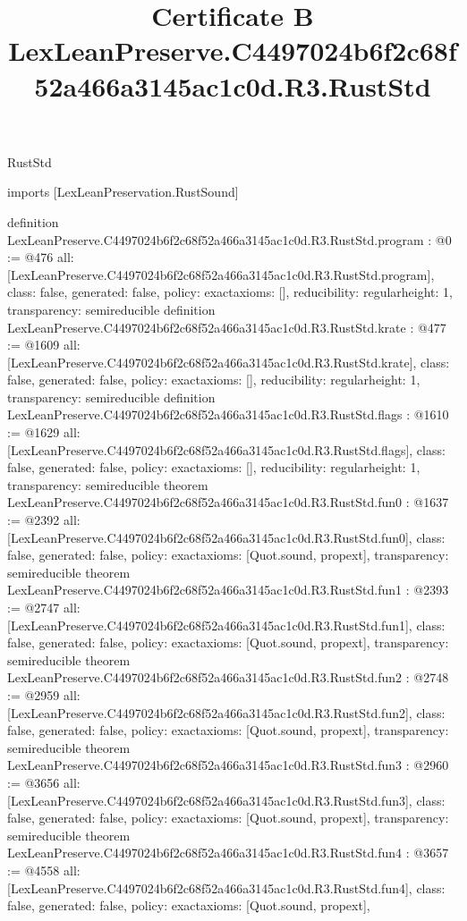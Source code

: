 \begin{lexlean}{RustStd}
\title{Certificate B LexLeanPreserve.C4497024b6f2c68f52a466a3145ac1c0d.R3.RustStd}
\begin{coremodule}
imports [LexLeanPreservation.RustSound]

definition LexLeanPreserve.C4497024b6f2c68f52a466a3145ac1c0d.R3.RustStd.program : @0 := @476 {
  all: [LexLeanPreserve.C4497024b6f2c68f52a466a3145ac1c0d.R3.RustStd.program],
  class: false,
  generated: false,
  policy: exact{axioms: []},
  reducibility: regular{height: 1},
  transparency: semireducible
}
definition LexLeanPreserve.C4497024b6f2c68f52a466a3145ac1c0d.R3.RustStd.krate : @477 := @1609 {
  all: [LexLeanPreserve.C4497024b6f2c68f52a466a3145ac1c0d.R3.RustStd.krate],
  class: false,
  generated: false,
  policy: exact{axioms: []},
  reducibility: regular{height: 1},
  transparency: semireducible
}
definition LexLeanPreserve.C4497024b6f2c68f52a466a3145ac1c0d.R3.RustStd.flags : @1610 := @1629 {
  all: [LexLeanPreserve.C4497024b6f2c68f52a466a3145ac1c0d.R3.RustStd.flags],
  class: false,
  generated: false,
  policy: exact{axioms: []},
  reducibility: regular{height: 1},
  transparency: semireducible
}
theorem LexLeanPreserve.C4497024b6f2c68f52a466a3145ac1c0d.R3.RustStd.fun0 : @1637 := @2392 {
  all: [LexLeanPreserve.C4497024b6f2c68f52a466a3145ac1c0d.R3.RustStd.fun0],
  class: false,
  generated: false,
  policy: exact{axioms: [Quot.sound, propext]},
  transparency: semireducible
}
theorem LexLeanPreserve.C4497024b6f2c68f52a466a3145ac1c0d.R3.RustStd.fun1 : @2393 := @2747 {
  all: [LexLeanPreserve.C4497024b6f2c68f52a466a3145ac1c0d.R3.RustStd.fun1],
  class: false,
  generated: false,
  policy: exact{axioms: [Quot.sound, propext]},
  transparency: semireducible
}
theorem LexLeanPreserve.C4497024b6f2c68f52a466a3145ac1c0d.R3.RustStd.fun2 : @2748 := @2959 {
  all: [LexLeanPreserve.C4497024b6f2c68f52a466a3145ac1c0d.R3.RustStd.fun2],
  class: false,
  generated: false,
  policy: exact{axioms: [Quot.sound, propext]},
  transparency: semireducible
}
theorem LexLeanPreserve.C4497024b6f2c68f52a466a3145ac1c0d.R3.RustStd.fun3 : @2960 := @3656 {
  all: [LexLeanPreserve.C4497024b6f2c68f52a466a3145ac1c0d.R3.RustStd.fun3],
  class: false,
  generated: false,
  policy: exact{axioms: [Quot.sound, propext]},
  transparency: semireducible
}
theorem LexLeanPreserve.C4497024b6f2c68f52a466a3145ac1c0d.R3.RustStd.fun4 : @3657 := @4558 {
  all: [LexLeanPreserve.C4497024b6f2c68f52a466a3145ac1c0d.R3.RustStd.fun4],
  class: false,
  generated: false,
  policy: exact{axioms: [Quot.sound, propext]},
}
\end{coremodule}
\end{lexlean}
